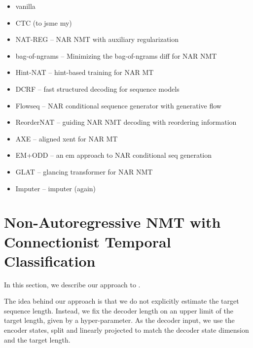 


\begin{itemize}
\item vanilla \citep{gu2017nonautoregressive}
\item CTC (to jsme my)
\item NAT-REG \citep{wang2019nonautoregressive} -- NAR NMT with auxiliary regularization
\item bag-of-ngrams \citep{shao2020minimizing} -- Minimizing the bag-of-ngrams diff for NAR NMT
\item Hint-NAT \citep{li2019hint} -- hint-based training for NAR MT
\item DCRF \citep{sun2019fast} -- fast structured decoding for sequence models
\item Flowseq \citep{ma2019flowseq} -- NAR conditional sequence generator with generative flow
\item ReorderNAT \citep{ran2019guiding} -- guiding NAR NMT decoding with reordering information
\item AXE \citep{ghazvininejad2020aligned} -- aligned xent for NAR MT
\item EM+ODD \citep{sun2020em} -- an em approach to NAR conditional seq generation
\item GLAT \citep{qian2020glancing} -- glancing transformer for NAR NMT
\item Imputer \citep{saharia2020nonautoregressive} -- imputer (again)
\end{itemize}

\section{Non-Autoregressive NMT with Connectionist Temporal Classification}
\label{sec:nat-ctc}


In this section, we describe our approach to .

The idea behind our approach is that we do not explicitly estimate the target
sequence length. Instead, we fix the decoder length on an upper limit of the
target length, given by a hyper-parameter. As the decoder input, we use the
encoder states, split and linearly projected to match the decoder state
dimension and the target length.

